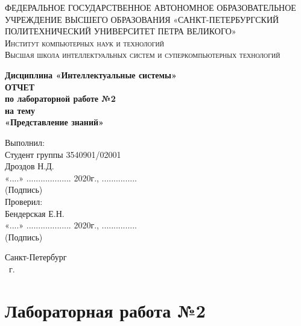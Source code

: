 \documentclass[14pt,a4paper,report]{report}
\begin{document}
\def\contentsname{Содержание}

\begin{titlepage}
	\begin{center}
		\textsc{ФЕДЕРАЛЬНОЕ ГОСУДАРСТВЕННОЕ АВТОНОМНОЕ ОБРАЗОВАТЕЛЬНОЕ УЧРЕЖДЕНИЕ ВЫСШЕГО ОБРАЗОВАНИЯ
«САНКТ-ПЕТЕРБУРГСКИЙ ПОЛИТЕХНИЧЕСКИЙ УНИВЕРСИТЕТ ПЕТРА ВЕЛИКОГО»\\[5mm]
			Институт компьютерных наук и технологий\\
			Высшая школа интеллектуальных систем и суперкомпьютерных технологий}
		
		\vfill
		
		\textbf{Дисциплина «Интеллектуальные системы»\\[10mm]
		ОТЧЕТ\\[2mm]
		по лабораторной работе №2\\[2mm]
		на тему\\[2mm]
			«Представление знаний»\\[41mm]
		}
	\end{center}
	
	\hfill
	\begin{minipage}{.4\textwidth}
		Выполнил:\\[2mm] 
        Студент группы 3540901/02001\\
		Дроздов Н.Д.\\[2mm]
        «....» ................... 2020г., ...............\\
        \hspace*{38mm} (Подпись)\\[2mm]
		Проверил:\\[2mm] 
		Бендерская Е.Н.\\[2mm]
		«....» ................... 2020г., ...............\\
        \hspace*{38mm} (Подпись)\\
	\end{minipage}
	\vfill
	\begin{center}
		Санкт-Петербург\\ \the\year\ г.
	\end{center}
\end{titlepage}

\tableofcontents
\clearpage

\chapter{Лабораторная работа №2}
\end{document}
